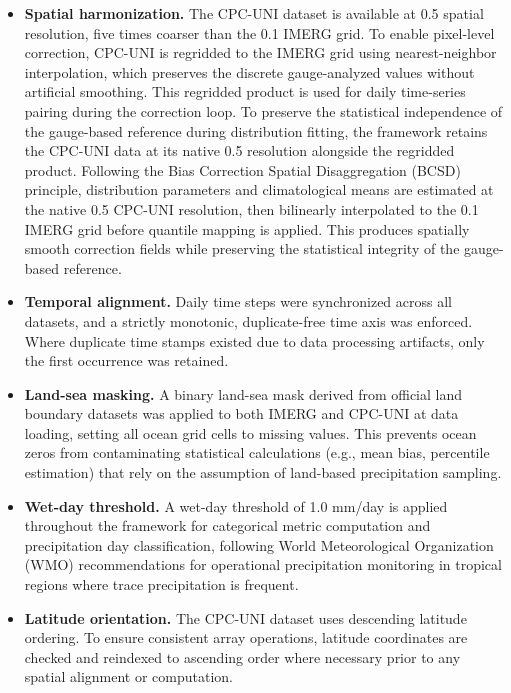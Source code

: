 \documentclass[11pt,a4paper]{article}
\begin{document}
\begin{itemize}
\item
  \textbf{Spatial harmonization.} The CPC-UNI dataset is available at
  0.5\textdegree{} spatial resolution, five times coarser than the 0.1\textdegree{} IMERG grid.
  To enable pixel-level correction, CPC-UNI is regridded to the IMERG
  grid using nearest-neighbor interpolation, which preserves the
  discrete gauge-analyzed values without artificial smoothing.
  This regridded product is used for daily time-series pairing during
  the correction loop. To preserve the statistical independence of the
  gauge-based reference during distribution fitting, the framework
  retains the CPC-UNI data at its native 0.5\textdegree{} resolution alongside the
  regridded product. Following the Bias Correction Spatial
  Disaggregation (BCSD) principle, distribution parameters and
  climatological means are estimated at the native 0.5\textdegree{} CPC-UNI
  resolution, then bilinearly interpolated to the 0.1\textdegree{} IMERG grid before
  quantile mapping is applied. This produces spatially smooth correction
  fields while preserving the statistical integrity of the gauge-based
  reference.
\item
  \textbf{Temporal alignment.} Daily time steps were synchronized across
  all datasets, and a strictly monotonic, duplicate-free time axis was
  enforced. Where duplicate time stamps existed due to data processing
  artifacts, only the first occurrence was retained.
\item
  \textbf{Land-sea masking.} A binary land-sea mask derived from
  official land boundary datasets was applied to both IMERG and CPC-UNI
  at data loading, setting all ocean grid cells to missing values. This
  prevents ocean zeros from contaminating statistical calculations
  (e.g., mean bias, percentile estimation) that rely on the assumption
  of land-based precipitation sampling.
\item
  \textbf{Wet-day threshold.} A wet-day threshold of 1.0 mm/day is
  applied throughout the framework for categorical metric computation
  and precipitation day classification, following World Meteorological
  Organization (WMO) recommendations for operational precipitation
  monitoring in tropical regions where trace precipitation is frequent.
\item
  \textbf{Latitude orientation.} The CPC-UNI dataset uses descending
  latitude ordering. To ensure consistent array operations, latitude
  coordinates are checked and reindexed to ascending order where
  necessary prior to any spatial alignment or computation.
\end{itemize}
\end{document}
